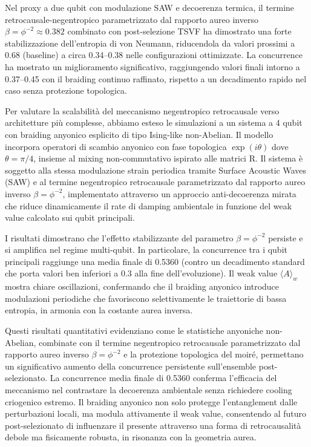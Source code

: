 \documentclass[11pt,a4paper]{article}
\theoremstyle{plain}
\theoremstyle{definition}
\begin{document}
Nel proxy a due qubit con modulazione SAW e decoerenza termica, il termine retrocausale-negentropico parametrizzato dal rapporto aureo inverso \(\beta = \phi^{-2} \approx 0.382\) combinato con post-selezione TSVF ha dimostrato una forte stabilizzazione dell'entropia di von Neumann, riducendola da valori prossimi a 0.68 (baseline) a circa 0.34--0.38 nelle configurazioni ottimizzate. La concurrence ha mostrato un miglioramento significativo, raggiungendo valori finali intorno a 0.37--0.45 con il braiding continuo raffinato, rispetto a un decadimento rapido nel caso senza protezione topologica.

Per valutare la scalabilità del meccanismo negentropico retrocausale verso architetture più complesse, abbiamo esteso le simulazioni a un sistema a 4 qubit con braiding anyonico esplicito di tipo Ising-like non-Abelian. Il modello incorpora operatori di scambio anyonico con fase topologica \(\exp(i\theta)\) dove \(\theta = \pi/4\), insieme al mixing non-commutativo ispirato alle matrici R. Il sistema è soggetto alla stessa modulazione strain periodica tramite Surface Acoustic Waves (SAW) e al termine negentropico retrocausale parametrizzato dal rapporto aureo inverso \(\beta = \phi^{-2}\), implementato attraverso un approccio anti-decoerenza mirata che riduce dinamicamente il rate di damping ambientale in funzione del weak value calcolato sui qubit principali.

I risultati dimostrano che l'effetto stabilizzante del parametro \(\beta = \phi^{-2}\) persiste e si amplifica nel regime multi-qubit. In particolare, la concurrence tra i qubit principali raggiunge una media finale di 0.5360 (contro un decadimento standard che porta valori ben inferiori a 0.3 alla fine dell'evoluzione). Il weak value \(\langle A \rangle_w\) mostra chiare oscillazioni, confermando che il braiding anyonico introduce modulazioni periodiche che favoriscono selettivamente le traiettorie di bassa entropia, in armonia con la costante aurea inversa.



Questi risultati quantitativi evidenziano come le statistiche anyoniche non-Abelian, combinate con il termine negentropico retrocausale parametrizzato dal rapporto aureo inverso \(\beta = \phi^{-2}\) e la protezione topologica del moiré, permettano un significativo aumento della concurrence persistente sull’ensemble post-selezionato. La concurrence media finale di 0.5360 conferma l'efficacia del meccanismo nel contrastare la decoerenza ambientale senza richiedere cooling criogenico estremo. Il braiding anyonico non solo protegge l'entanglement dalle perturbazioni locali, ma modula attivamente il weak value, consentendo al futuro post-selezionato di influenzare il presente attraverso una forma di retrocausalità debole ma fisicamente robusta, in risonanza con la geometria aurea.
\end{document}
